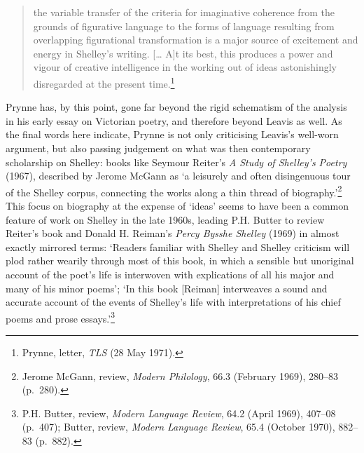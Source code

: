 \documentclass[]{article}
\begin{document}
\begin{quote}
the variable transfer of the criteria for imaginative coherence from the
grounds of figurative language to the forms of language resulting from
overlapping figurational transformation is a major source of excitement
and energy in Shelley's writing. {[}\ldots{} A{]}t its best, this
produces a power and vigour of creative intelligence in the working out
of ideas astonishingly disregarded at the present time.\footnote{Prynne,
  letter, \emph{TLS} (28 May 1971).}
\end{quote}

\noindent Prynne has, by this point, gone far beyond the rigid
schematism of the analysis in his early essay on Victorian poetry, and
therefore beyond Leavis as well. As the final words here indicate,
Prynne is not only criticising Leavis's well-worn argument, but also
passing judgement on what was then contemporary scholarship on Shelley:
books like Seymour Reiter's \emph{A Study of Shelley's Poetry} (1967),
described by Jerome McGann as `a leisurely and often disingenuous tour
of the Shelley corpus, connecting the works along a thin thread of
biography.'\footnote{Jerome McGann, review, \emph{Modern Philology},
  66.3 (February 1969), 280--83 (p.~280).} This focus on biography at
the expense of `ideas' seems to have been a common feature of work on
Shelley in the late 1960s, leading P.H. Butter to review Reiter's book
and Donald H. Reiman's \emph{Percy Bysshe Shelley} (1969) in almost
exactly mirrored terms: `Readers familiar with Shelley and Shelley
criticism will plod rather wearily through most of this book, in which a
sensible but unoriginal account of the poet's life is interwoven with
explications of all his major and many of his minor poems'; `In this
book {[}Reiman{]} interweaves a sound and accurate account of the events
of Shelley's life with interpretations of his chief poems and prose
essays.'\footnote{P.H. Butter, review, \emph{Modern Language Review},
  64.2 (April 1969), 407--08 (p.~407); Butter, review, \emph{Modern
  Language Review}, 65.4 (October 1970), 882--83 (p.~882).}
\end{document}
